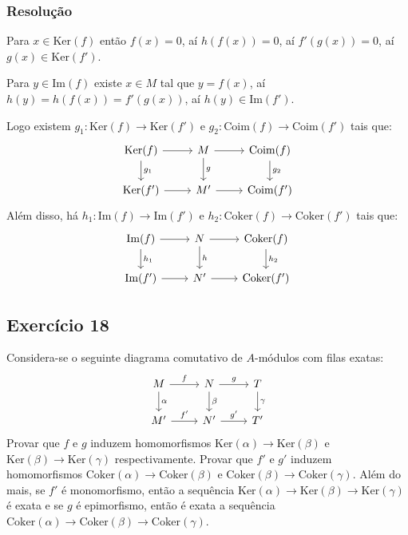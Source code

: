 \documentclass[10pt,a4paper]{article}
\begin{document}
\subsubsection*{Resolução}

Para $x\in\mathrm{Ker}(f)$ então $f(x)=0$, aí $h(f(x))=0$, aí $f'(g(x))=0$, aí $g(x)\in\mathrm{Ker}(f')$.

\medskip
\noindent
Para $y\in\mathrm{Im}(f)$ existe $x\in M$ tal que $y=f(x)$, aí $h(y)=h(f(x))=f'(g(x))$, aí $h(y)\in\mathrm{Im}(f')$.

\medskip
\noindent
Logo existem $g_1:\mathrm{Ker}(f)\rightarrow\mathrm{Ker}(f')$ e $g_2:\mathrm{Coim}(f)\rightarrow\mathrm{Coim}(f')$ tais que:
\[
\begin{tikzcd}
\mathrm{Ker}(f) \arrow{r} \arrow{d}{g_1} & M \arrow{r} \arrow{d}{g} & \mathrm{Coim}(f) \arrow{d}{g_2} \\
\mathrm{Ker}(f') \arrow{r}                 & M' \arrow{r}               & \mathrm{Coim}(f')                
\end{tikzcd}
\]
Além disso, há $h_1:\mathrm{Im}(f)\rightarrow\mathrm{Im}(f')$ e $h_2:\mathrm{Coker}(f)\rightarrow\mathrm{Coker}(f')$ tais que:
\[
\begin{tikzcd}
\mathrm{Im}(f) \arrow{r} \arrow{d}{h_1} & N \arrow{r} \arrow{d}{h} & \mathrm{Coker}(f) \arrow{d}{h_2} \\
\mathrm{Im}(f') \arrow{r}                 & N' \arrow{r}               & \mathrm{Coker}(f')                
\end{tikzcd}
\]

\subsection*{Exercício 18}

Considera-se o seguinte diagrama comutativo de $A$-módulos com filas exatas:
\[
\begin{tikzcd}
M \arrow{r}{f} \arrow{d}{\alpha} & N \arrow{r}{g} \arrow{d}{\beta} & T \arrow{d}{\gamma} \\
M' \arrow{r}{f'}                   & N' \arrow{r}{g'}                  & T'                   
\end{tikzcd}
\]
Provar que $f$ e $g$ induzem homomorfismos $\mathrm{Ker}(\alpha)\rightarrow\mathrm{Ker}(\beta)$ e $\mathrm{Ker}(\beta)\rightarrow\mathrm{Ker}(\gamma)$ respectivamente. Provar que $f'$ e $g'$ induzem homomorfismos $\mathrm{Coker}(\alpha)\rightarrow\mathrm{Coker}(\beta)$ e $\mathrm{Coker}(\beta)\rightarrow\mathrm{Coker}(\gamma)$. Além do mais, se $f'$ é monomorfismo, então a sequência $\mathrm{Ker}(\alpha)\rightarrow\mathrm{Ker}(\beta)\rightarrow\mathrm{Ker}(\gamma)$ é exata e se $g$ é epimorfismo, então é exata a sequência $\mathrm{Coker}(\alpha)\rightarrow\mathrm{Coker}(\beta)\rightarrow\mathrm{Coker}(\gamma)$.
\end{document}
